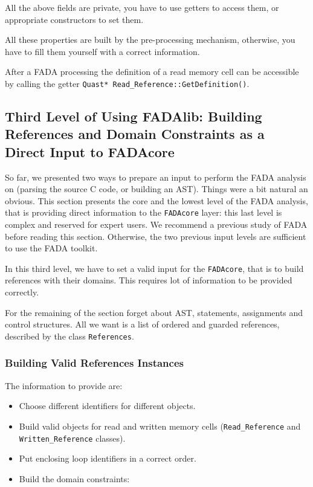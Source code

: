All the above fields are private, you have to use getters to access them, or appropriate constructors to set them.

All these properties are built by the pre-processing mechanism, otherwise, you have to fill them yourself with a correct information.

After a FADA processing the definition of a read memory cell can be accessible by calling the getter \lstinline|Quast* Read_Reference::GetDefinition()|.


\subsection{Third Level of Using FADAlib: Building References and Domain Constraints as a Direct Input to FADAcore}

So far, we presented two ways to prepare an input to perform the FADA analysis on (parsing the source C code, or building an AST). Things were a bit natural an obvious. This section presents the core and the lowest level of the FADA analysis, that is providing direct information to the \verb|FADAcore| layer: this last level is complex and reserved for expert users. We recommend a  previous study of FADA before reading this section. Otherwise, the two previous input levels are sufficient to use the FADA toolkit.

In this third level, we have to set a valid input for the \verb|FADAcore|, that is to build references with  their domains. This requires lot of information to be provided correctly.

For the remaining of the section forget about AST, statements, assignments and control structures. All we want is a list of ordered and guarded references, described by the class \verb|References|.


\subsubsection{Building Valid References Instances}

The information to provide are:
\begin{itemize}
 \item Choose different identifiers for different objects.
 \item Build valid objects for read and written memory cells (\verb|Read_Reference| and \verb|Written_Reference| classes).
 \item Put enclosing loop identifiers in a correct order.
 \item Build the domain constraints:
\end{itemize}

